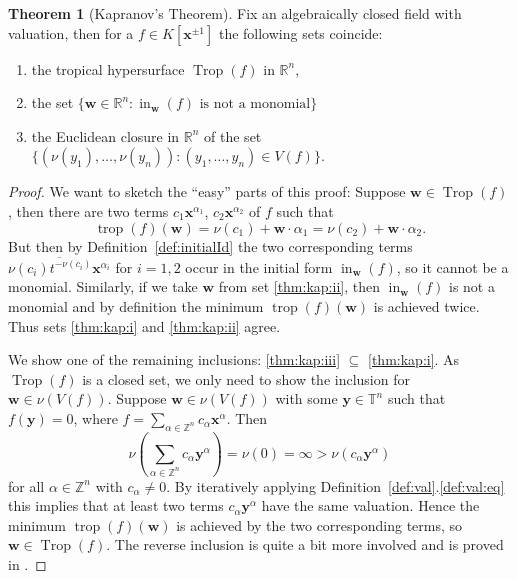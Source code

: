 \documentclass[
  paper=a4,
  titlepage,
  bibliography=totoc,
  pagesize=pdftex
]{scrartcl}
\numberwithin{figure}{section}
\numberwithin{equation}{section}
\numberwithin{table}{section}
\newcommand*\setZ{\mathds{Z}}
\newcommand*\setR{\mathds{R}}
\newcommand*\setT{\mathds{T}}
\let\vec\mathbf
\DeclareMathOperator{\Trop}{Trop}
\DeclareMathOperator{\trop}{trop}
\DeclareMathOperator{\initial}{in}
\theoremstyle{definition}
\newtheorem{theorem}[definition]{Theorem}
\numberwithin{definition}{section}
\begin{document}
\begin{theorem}[Kapranov's Theorem]
  \label{thm:kapranov}
  Fix an algebraically closed field with valuation, then for a $f \in K[\vec x^{\pm1}]$
  the following sets coincide:
  \begin{enumerate}
    \item the tropical hypersurface $\Trop(f)$ in $\setR^n$,
      \label{thm:kap:i}
    \item the set $\{ \vec w \in \setR^n : \initial_{\vec w}(f) \text{ is not a
      monomial}\}$
      \label{thm:kap:ii}
    \item the Euclidean closure in $\setR^n$ of the set $\{ (\nu(y_1), \dots, \nu(y_n)) :
      (y_1,\dots,y_n) \in V(f) \}$.
      \label{thm:kap:iii}
  \end{enumerate}
  \begin{proof}
    We want to sketch the \enquote{easy} parts of this proof: Suppose $\vec w \in
    \Trop(f)$, then there are two terms $c_1 \vec x^{\alpha_1}$, $c_2 \vec x^{\alpha_2}$
    of $f$ such that
    \[
      \trop(f)(\vec w) = \nu(c_1) + \vec w \cdot \alpha_1 = \nu(c_2) + \vec w \cdot \alpha_2.
    \]
    But then by Definition~\ref{def:initialId} the two corresponding terms
    $\overline{\nu(c_i)t^{-\nu(c_i)}\vec x^{\alpha_i}}$ for $i=1,2$ occur in the initial
    form $\initial_{\vec w}(f)$, so it cannot be a monomial. Similarly, if we take $\vec
    w$ from set \ref{thm:kap:ii}, then $\initial_{\vec w}(f)$ is not a monomial and by
    definition the minimum $\trop(f)(\vec w)$ is achieved twice. Thus sets \ref{thm:kap:i}
    and \ref{thm:kap:ii} agree.

    We show one of the remaining inclusions: \ref{thm:kap:iii} $\subseteq$
    \ref{thm:kap:i}. As $\Trop(f)$ is a closed set, we only need to show the inclusion for
    $\vec w \in \nu(V(f))$. Suppose $\vec w \in \nu(V(f))$ with some $\vec y \in \setT^n$
    such that $f(\vec y) = 0$, where $f = \sum_{\alpha \in \setZ^n} c_\alpha \vec
    x^\alpha$. Then
    \[
      \nu \left( \sum_{\alpha \in \setZ^n} c_\alpha \vec y^\alpha \right) = \nu(0) =
      \infty > \nu(c_\alpha \vec y^\alpha)
    \]
    for all $\alpha \in \setZ^n$ with $c_\alpha \neq 0$. By iteratively applying
    Definition~\ref{def:val}.\ref{def:val:eq} this implies that at least two terms
    $c_\alpha \vec y^\alpha$ have the same valuation. Hence the minimum $\trop(f)(\vec w)$
    is achieved by the two corresponding terms, so $\vec w \in \Trop(f)$. The reverse
    inclusion is quite a bit more involved and is proved in
    \cite[Proposition~3.1.5]{sturmMacTrop}.
  \end{proof}
\end{theorem}
\end{document}
